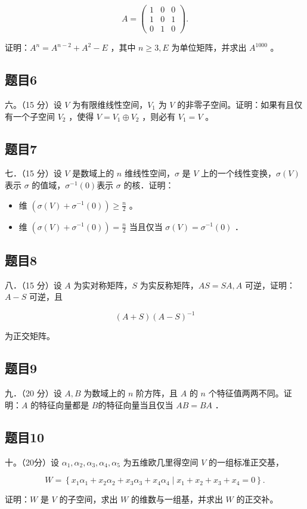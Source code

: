 \documentclass{article}
\begin{document}
\[
A=\left(\begin{array}{lll}
1 & 0 & 0 \\
1 & 0 & 1 \\
0 & 1 & 0
\end{array}\right) .
\]

证明：\(A^{n}=A^{n-2}+A^{2}-E\) ，其中 \(n \geq 3, E\) 为单位矩阵，并求出 \(A^{1000}\) 。

\subsection{题目6}
六。（15 分）设 \(V\) 为有限维线性空间，\(V_{1}\) 为 \(V\) 的非零子空间。证明：如果有且仅有一个子空间 \(V_{2}\) ，使得 \(V=V_{1} \oplus V_{2}\) ，则必有 \(V_{1}=V\) 。

\subsection{题目7}
七．（15 分）设 \(V\) 是数域上的 \(n\) 维线性空间，\(\sigma\) 是 \(V\) 上的一个线性变换，\(\sigma(V)\) 表示 \(\sigma\) 的值域，\(\sigma^{-1}(0)\)表示 \(\sigma\) 的核．证明：

\begin{itemize}
  \item[（1）] 维 \(\left(\sigma(V)+\sigma^{-1}(0)\right) \geq \frac{n}{2}\) 。
  \item[（2）] 维 \(\left(\sigma(V)+\sigma^{-1}(0)\right)=\frac{n}{2}\) 当且仅当 \(\sigma(V)=\sigma^{-1}(0)\) ．
\end{itemize}

\subsection{题目8}
八．（15 分）设 \(A\) 为实对称矩阵，\(S\) 为实反称矩阵，\(A S=S A, A\) 可逆，证明：\(A-S\) 可逆，且

\[
(A+S)(A-S)^{-1}
\]

为正交矩阵。

\subsection{题目9}
九．（20 分）设 \(A, B\) 为数域上的 \(n\) 阶方阵，且 \(A\) 的 \(n\) 个特征值两两不同。证明：\(A\) 的特征向量都是 \(B\)的特征向量当且仅当 \(A B=B A\) ．

\subsection{题目10}
十。（20分）设 \(\alpha_{1}, \alpha_{2}, \alpha_{3}, \alpha_{4}, \alpha_{5}\) 为五维欧几里得空间 \(V\) 的一组标准正交基，

\[
W=\left\{x_{1} \alpha_{1}+x_{2} \alpha_{2}+x_{3} \alpha_{3}+x_{4} \alpha_{4} \mid x_{1}+x_{2}+x_{3}+x_{4}=0\right\} .
\]

证明：\(W\) 是 \(V\) 的子空间，求出 \(W\) 的维数与一组基，并求出 \(W\) 的正交补。
\end{document}
